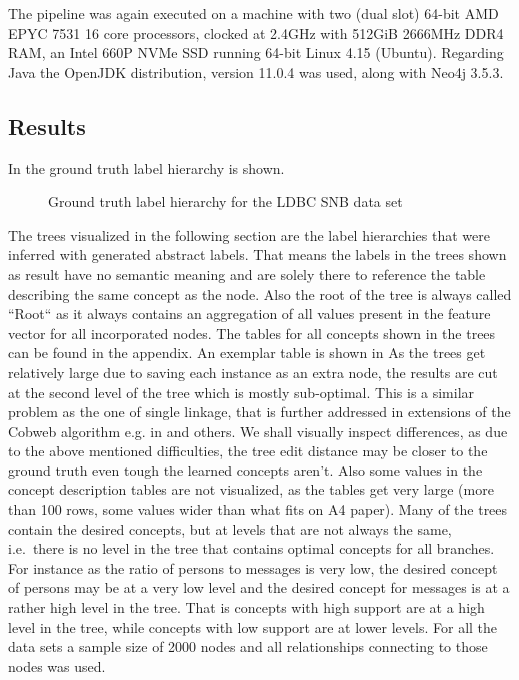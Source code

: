 The pipeline was again executed on a machine with two (dual slot) 64-bit AMD EPYC 7531 16 core processors, clocked at 2.4GHz with 512GiB 2666MHz DDR4 RAM, an Intel 660P NVMe SSD running 64-bit Linux 4.15 (Ubuntu). Regarding Java the OpenJDK distribution, version 11.0.4 was used, along with Neo4j 3.5.3.

\subsection{Results}\label{\positionnumber}
In  the ground truth label hierarchy is shown.
\begin{figure}
    \centering
    
    \caption{Ground truth label hierarchy for the LDBC SNB data set}
    \label{fig:ldbctree}
\end{figure}{}
The trees visualized in the following section are the label hierarchies that were inferred with generated abstract labels. That means the labels in the trees shown as result have no semantic meaning and are solely there to reference the table describing the same concept as the node. Also the root of the tree is always called ``Root`` as it always contains an aggregation of all values present in the feature vector for all incorporated nodes. The tables for all concepts shown in the trees can be found in the appendix. An exemplar table is shown in 
As the trees get relatively large due to saving each instance as an extra node, the results are cut at the second level of the tree which is mostly sub-optimal. This is a similar problem as the one of single linkage, that is further addressed in extensions of the Cobweb algorithm e.g. in \cite{classit, thompson1989incremental} and others.
We shall visually inspect differences, as due to the above mentioned difficulties, the tree edit distance may be closer to the ground truth even tough the learned concepts aren't. 
Also some values in the concept description tables are not visualized, as the tables get very large (more than 100 rows, some values wider than what fits on A4 paper). 
Many of the trees contain the desired concepts, but at levels that are not always the same, i.e.~there is no level in the tree that contains optimal concepts for all branches. 
For instance as the ratio of persons to messages is very low, the desired concept of persons may be at a very low level and the desired concept for messages is at a rather high level in the tree. 
That is concepts with high support are at a high level in the tree, while concepts with low support are at lower levels. For all the data sets a sample size of 2000 nodes and all relationships connecting to those nodes was used. \\

